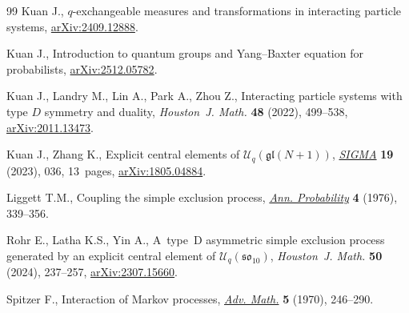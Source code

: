 \documentclass[pdftex]{sigma}
\numberwithin{equation}{section}
\theoremstyle{definition}
\begin{document}
\begin{thebibliography}{99}
Kuan J., $q$-exchangeable measures and transformations in interacting particle
 systems, \href{https://arxiv.org/abs/2409.12888}{arXiv:2409.12888}.

Kuan J., Introduction to quantum groups and Yang--Baxter equation for
 probabilists, \href{https://arxiv.org/abs/2512.05782}{arXiv:2512.05782}.

Kuan J., Landry M., Lin A., Park A., Zhou Z., Interacting particle systems with
 type {$D$} symmetry and duality, \textit{Houston~J. Math.} \textbf{48}
 (2022), 499--538, \href{https://arxiv.org/abs/2011.13473}{arXiv:2011.13473}.

Kuan J., Zhang K., Explicit central elements of
 {$\mathcal{U}_q(\mathfrak{gl}(N+1))$},
 \href{https://doi.org/10.3842/SIGMA.2023.036}{\textit{SIGMA}} \textbf{19}
 (2023), 036, 13~pages,
 \href{https://arxiv.org/abs/1805.04884}{arXiv:1805.04884}.

Liggett T.M., Coupling the simple exclusion process,
 \href{https://doi.org/10.1214/aop/1176996084}{\textit{Ann. Probability}}
 \textbf{4} (1976), 339--356.

Rohr E., Latha K.S., Yin A., A~type~{D} asymmetric simple exclusion process
 generated by an explicit central element of {$\mathcal
 U_q(\mathfrak{so}_{10})$}, \textit{Houston~J. Math.} \textbf{50} (2024),
 237--257, \href{https://arxiv.org/abs/2307.15660}{arXiv:2307.15660}.

Spitzer F., Interaction of {M}arkov processes,
 \href{https://doi.org/10.1016/0001-8708(70)90034-4}{\textit{Adv. Math.}}
 \textbf{5} (1970), 246--290.

\end{thebibliography}\LastPageEnding
\end{document}
